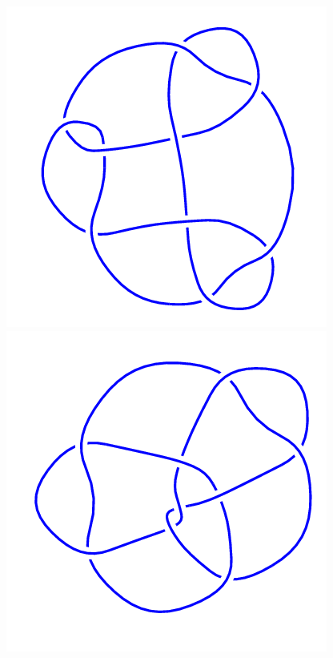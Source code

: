 \begin{figure}[H]
\begin{minipage}[b]{.18\linewidth}
	\end{minipage}
	\begin{minipage}[b]{.18\linewidth}
		\centering
		\includegraphics[width=\linewidth]{../data/9_28.png}
	\end{minipage}
	\begin{minipage}[b]{.18\linewidth}
		\centering
		\includegraphics[width=\linewidth]{../data/9_29.png}

\end{minipage}
\end{figure}
